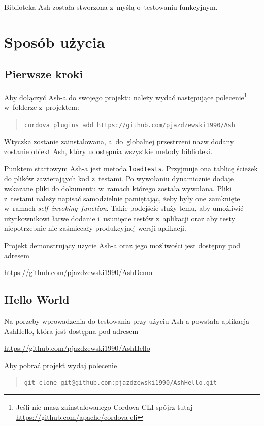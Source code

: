 \documentclass[brudnopis]{xmgr}
\begin{document}
Biblioteka Ash została stworzona z~myślą o~testowaniu funkcyjnym.

\chapter{Sposób użycia}
\section{Pierwsze kroki}

Aby dołączyć Ash-a do swojego projektu należy wydać następujące polecenie\footnote{Jeśli nie masz zainstalowanego Cordova CLI spójrz tutaj \url{https://github.com/apache/cordova-cli} } w~folderze z~projektem:
\begin{quote}
   \texttt{cordova plugins add https://github.com/pjazdzewski1990/Ash}
\end{quote}

Wtyczka zostanie zainstalowana, a~do~globalnej przestrzeni nazw dodany zostanie obiekt Ash, który udostępnia wszystkie metody biblioteki.

Punktem startowym Ash-a jest metoda \texttt{loadTests}. Przyjmuje ona tablicę ścieżek do plików zawierająych kod z~testami. Po wywołaniu dynamicznie dodaje wskazane pliki do dokumentu w~ramach którego została wywołana. Pliki z~testami należy napisać samodzielnie pamiętając, żeby były one zamknięte w~ramach \textit{self--invoking--function}. Takie podejście służy temu, aby umożliwić użytkownikowi łatwe dodanie i~usunięcie testów z~aplikacji oraz aby testy niepotrzebnie nie zaśmiecały produkcyjnej wersji aplikacji.

Projekt demonstrujący użycie Ash-a oraz jego możliwości jest dostępny pod adresem

\url{https://github.com/pjazdzewski1990/AshDemo}

\section{Hello World}

Na porzeby wprowadzenia do testowania przy użyciu Ash-a powstała aplikacja AshHello, która jest dostępna pod adresem 

\url{https://github.com/pjazdzewski1990/AshHello}

Aby pobrać projekt wydaj polecenie

\begin{quote}
   \texttt{git clone git@github.com:pjazdzewski1990/AshHello.git}
\end{quote}
\end{document}

